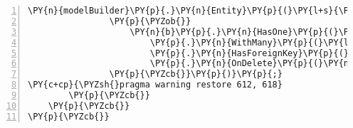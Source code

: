 \begin{Verbatim}[commandchars=\\\{\},numbers=left,firstnumber=1,stepnumber=1,numberblanklines=0]
            \PY{n}{modelBuilder}\PY{p}{.}\PY{n}{Entity}\PY{p}{(}\PY{l+s}{\PYZdq{}CryptoStats.Models.Stat\PYZdq{}}\PY{p}{,} \PY{n}{b} \PY{p}{=}\PY{p}{\PYZgt{}}
                \PY{p}{\PYZob{}}
                    \PY{n}{b}\PY{p}{.}\PY{n}{HasOne}\PY{p}{(}\PY{l+s}{\PYZdq{}CryptoStats.Models.Exchange\PYZdq{}}\PY{p}{,} \PY{l+s}{\PYZdq{}Exchange\PYZdq{}}\PY{p}{)}
                        \PY{p}{.}\PY{n}{WithMany}\PY{p}{(}\PY{l+s}{\PYZdq{}Stats\PYZdq{}}\PY{p}{)}
                        \PY{p}{.}\PY{n}{HasForeignKey}\PY{p}{(}\PY{l+s}{\PYZdq{}ExchangeId\PYZdq{}}\PY{p}{)}
                        \PY{p}{.}\PY{n}{OnDelete}\PY{p}{(}\PY{n}{DeleteBehavior}\PY{p}{.}\PY{n}{Cascade}\PY{p}{)}\PY{p}{;}
                \PY{p}{\PYZcb{}}\PY{p}{)}\PY{p}{;}
\PY{c+cp}{\PYZsh{}pragma warning restore 612, 618}
        \PY{p}{\PYZcb{}}
    \PY{p}{\PYZcb{}}
\PY{p}{\PYZcb{}}
\end{Verbatim}
